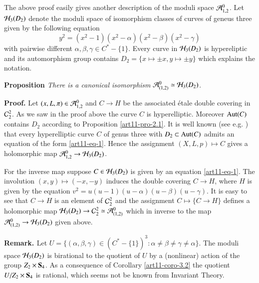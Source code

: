 The above proof easily gives another description of the moduli space $\mathcal{A}_{1,2}^{0}$. Let $\mathcal{H}_{3}(D_{2})$ denote the moduli space of isomorphism classes of curves of geneus three given by the following equation
\begin{equation}\label{art11-eq-1}
y^{2} =(x^{2}-1)(x^{2}-\alpha )(x^{2}-\beta)(x^{2}-\gamma)
\end{equation}
with pairwise different $\alpha, \beta, \gamma \in C^{*}-\{1\}$. Every curve in $\mathcal{H}_{3}(D_{2})$ is hypereliptic and its automorphism group contains $D_{2} = \{x \mapsto \pm x, y \mapsto \pm y\}$ which explains the notation.

\medskip
\noindent
{\bfseries  {} Proposition \label{art11-prop-3.3}} \textit{There is  a canonical isomorphism}
     $\mathcal{A}_{(1,2)}^{0}\simeq \mathcal{H}_{3}(D_{2})$.

\medskip
\noindent
{\bfseries Proof.} Let $(x, L, \pi )\in \mathcal{A}_{1,2}^{0}$ and $ C\rightarrow H$ be the associated \'etale double covering in $\mathcal{C}_{2}^{2}$. As we saw in the proof above the curve $C$ is hyperelliptic. Moreover $\operatorname{Aut}(C)$ contains $D_{2}$ according to Proposition \ref{art11-pro-2.1}. It is well known (see e.g. \cite{art11-keyI}) that every hyperelliptic curve $C$ of genus three with $D_{2} \subset \operatorname{Aut}(C)$ admits an equation of the form \eqref{art11-eq-1}. Hence the assignment $(X,L,p)\mapsto C$ gives a holomorphic map $\mathcal{A}_{1,2}^{0} \rightarrow \mathcal{H}_{3}(D_{2})$.

For the inverse map suppose $C\in \mathcal{H}_{3}(D_{2})$ is given by an equation \eqref{art11-eq-1}. The involution $(x,y) \mapsto (-x,-y)$ induces the double covering $C\rightarrow H$, where $H$ is given by the equation $v^{2} = u(u-1)(u-\alpha)(u-\beta)(u-\gamma)$. It is easy to see that $C\rightarrow H$ is an element of $\mathcal{C}_{2}^{2}$ and the assignment $C\mapsto \{C\rightarrow H\}$ defines a holomorphic map $\mathcal{H}_{3}(D_{2}) \rightarrow \mathcal{C}_{2}^{2} \simeq \mathcal{A}_{(1,2)}^{0}$ which in inverse to the  map $\mathcal{A}_{(1,2)}^{0} \rightarrow \mathcal{H}_{3}(D_{2})$ given above.

\medskip
\noindent
{\bfseries  {} Remark. \label{art11-remark-3.4}} Let $U =\{(\alpha, \beta, \gamma) \in (C^{*}-\{1\})^{3} : \alpha \neq \beta \neq \gamma \neq \alpha\}$. The moduli space $\mathcal{H}_{3}(D_{2})$ is birational to the quotient of $U$ by a (nonlinear) action of the group $Z_{2} \times \mathbf{S}_{4}$. As a consequence of Corollary \ref{art11-coro-3.2} the quotient
$ U/Z_{2} \times \mathbf{S}_{4}$ is rational, which seems not be known from Invariant Theory.


